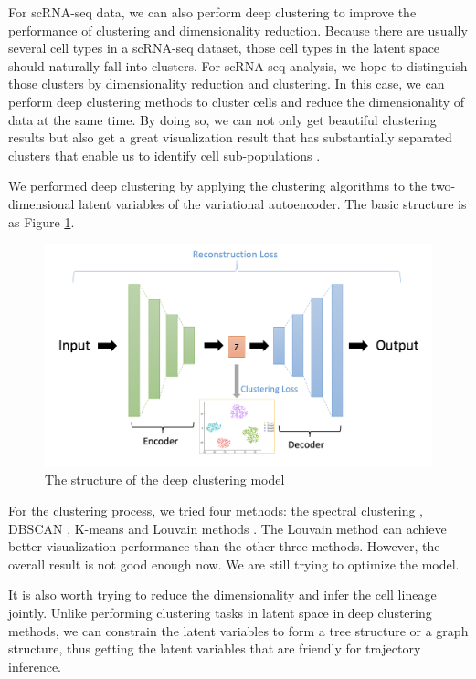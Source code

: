 For scRNA-seq data, we can also perform deep clustering to improve the performance of clustering and dimensionality reduction. Because there are usually several cell types in a scRNA-seq dataset, those cell types in the latent space should naturally fall into clusters. For scRNA-seq analysis, we hope to distinguish those clusters by dimensionality reduction and clustering. In this case, we can perform deep clustering methods to cluster cells and reduce the dimensionality of data at the same time. By doing so, we can not only get beautiful clustering results but also get a great visualization result that has substantially separated clusters that enable us to identify cell sub-populations \cite{tian2019clustering}. 

We performed deep clustering by applying the clustering algorithms to the two-dimensional latent variables of the variational autoencoder. The basic structure is as Figure \ref{dcstru}. 

\begin{figure}[htb!]
    \centering
    \includegraphics[width=1\textwidth]{figures/myfigures/dc.png}
    \caption{The structure of the deep clustering model}
    \label{dcstru}
\end{figure}

For the clustering process, we tried four methods: the spectral clustering \cite{von2007tutorial}, DBSCAN \cite{ester1996density}, K-means \cite{kanungo2002efficient} and Louvain methods \cite{traag2019louvain}. The Louvain method can achieve better visualization performance than the other three methods. However, the overall result is not good enough now. We are still trying to optimize the model.

It is also worth trying to reduce the dimensionality and infer the cell lineage jointly. Unlike performing clustering tasks in latent space in deep clustering methods, we can constrain the latent variables to form a tree structure or a graph structure, thus getting the latent variables that are friendly for trajectory inference.

